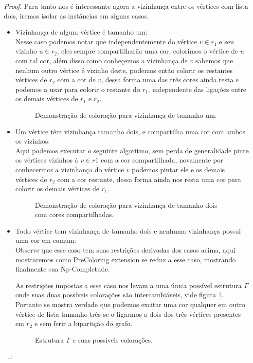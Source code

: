 \begin{proof}
 Para tanto nos é interessante agora a vizinhança entre os vértices com lista dois, iremos isolar as instâncias em alguns casos.
 \begin{itemize}
   \item Vizinhança de algum vértice é tamanho um:\\
   Nesse caso podemos notar que independentemente do vértice $v \in r_1$ e seu vizinho $u \in r_2$, eles sempre compartilharão uma cor, colorimos o vértice de $u$ com tal cor, além disso como conheçemos a vizinhança de $v$ sabemos que nenhum outro vértice é vizinho deste, podemos então colorir os restantes vértices de $r_2$ com a cor de $v$, dessa forma uma das três cores ainda resta e podemos a usar para colorir o restante do $r_1$, independente das ligações entre os demais vértices de $r_1$ e $r_2$.
   \begin{figure}[H]
     \centering
     \fontsize{6}{10}
     
     \caption{Demonstração de coloração para vizinhança de tamanho um.}
   \end{figure}
   \item Um vértice têm vizinhança tamanho dois, e compartilha uma cor com ambos os vizinhos:\\
    Aqui podemos executar o seguinte algoritmo, sem perda de generalidade pinte os vértices vizinhos à $v \in r1$ com a cor compartilhada, novamente por conhecermos a vizinhança do vértice $v$ podemos pintar ele e os demais vértices de $r_2$ com a cor restante, dessa forma ainda nos resta uma cor para colorir os demais vértices de $r_1$.
    \begin{figure}[H]
     \centering
     \fontsize{6}{10}
     
     \caption{Demonstração de coloração para vizinhança de tamanho dois com cores compartilhadas.}
   \end{figure}
   \item Todo vértice tem vizinhança de tamanho dois e nenhuma vizinhança possui uma cor em comum:\\
   Observe que esse caso tem suas restrições derivadas dos casos acima, aqui mostraremos como PreColoring extension se reduz a esse caso, mostrando finalmente sua Np-Completude.
   
   As restrições impostas a esse caso nos levam a uma única possível estrutura $\Gamma$ onde suas duas possíveis colorações são intercambiáveis, vide figura \ref{fig:2-edge-b}. Portanto se mostra verdade que podemos excitar uma cor qualquer em outro vértice de lista tamanho três se o ligarmos a dois dos três vértices presentes em $r_2$ e sem ferir a bipartição do grafo.
   \begin{figure}[H]
     \centering
     \fontsize{6}{10}
     
     \label{fig:2-edge-b}
     \caption{Estrutura $\Gamma$ e suas possíveis colorações.}
   \end{figure}
   

\end{itemize}
\end{proof}
